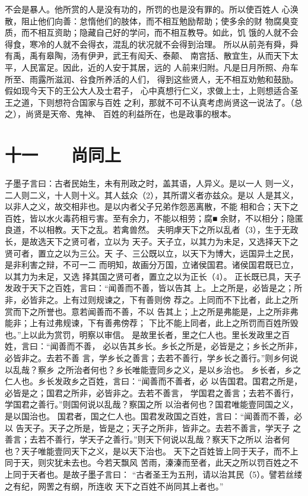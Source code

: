 \documentclass[12pt,UTF8]{ctexbook}
\begin{document}
不会是暴人。他所赏的人是没有功的，所罚的也是没有罪的。所以使百姓人 
心涣散，阻止他们向善：怠惰他们的肢体，而不相互勉励帮助；使多余的财 
物腐臭变质，而不相互资助；隐藏自己好的学问，而不相互教导。如此，饥 
饿的人就不会得食，寒冷的人就不会得衣，混乱的状况就不会得到治理。 
所以从前尧有舜，舜有禹，禹有皋陶，汤有伊尹，武王有闳夭、泰颠、 
南宫括、散宜生，从而天下太平，人民富足。因此，近的人安于其居，远的 
人前来归附。凡是日月所照、舟车所至、雨露所滋润、谷食所养活的人们， 
得到这些贤人，无不相互劝勉和鼓励。假如现今天下的王公大人及士君子， 
心中真想行仁义，求做上士，上则想适合圣王之道，下则想符合国家与百姓 
之利，那就不可不认真考虑尚贤这一说法了。（总之），尚贤是天帝、鬼神、 
百姓的利益所在，也是政事的根本。 

\chapter{十一　　尚同上}

子墨子言曰：古者民始生，未有刑政之时，盖其语，人异义。是以一人 
则一义，二人则二义，十人则十义。其人兹众（2），其所谓义者亦兹众。是以 
人是其义，以非人之义，故交相非也。是以内者父子兄弟作怨恶离散，不能 
相和合；天下之百姓，皆以水火毒药相亏害。至有余力，不能以相劳；腐■ 
余财，不以相分；隐匿良道，不以相教。天下之乱。若禽兽然。 
夫明虖天下之所以乱者（3），生于无政长，是故选天下之贤可者，立以为 
天子。天子立，以其力为未足，又选择天下之贤可者，置立之以为三公。天 
子、三公既以立，以天下为博大，远国异土之民，是非利害之辩，不可一二 
而明知，故画分万国，立诸侯国君。诸侯国君既已立，以其力为未足，又选 
择其国之贤可者，置立之以为正长（4）。 
正长既已具，天子发政于天下之百姓，言曰：“闻善而不善，皆以告其 
上。上之所是，必皆是之；所非，必皆非之。上有过则规谏之，下有善则傍 
荐之。上同而不下比者，此上之所赏而下之所誉也。意若闻善而不善，不以 
告其上；上之所是弗能是，上之所非弗能非；上有过弗规谏，下有善弗傍荐； 
下比不能上同者，此上之所罚而百姓所毁也。”上以此为赏罚，明察以审信。 
是故里长者，里之仁人也。里长发政里之百姓，言曰：“闻善而不善， 
必以告其乡长。乡长之所是，必皆是之；乡长之所非，必皆非之。去若不善 
言，学乡长之善言；去若不善行，学乡长之善行。”则乡何说以乱哉？察乡 
之所治者何也？乡长唯能壹同乡之义，是以乡治也。 
乡长者，乡之仁人也。乡长发政乡之百姓，言曰：“闻善而不善者，必 
以告国君。国君之所是，必皆是之；国君之所非，必皆非之。去若不善言， 
学国君之善言；去若不善行，学国君之善行。”则国何说以乱哉？察国之所 
以治者何也？国君唯能壹同国之义，是以国治也。 
国君者，国之仁人也。国君发政国之百姓，言曰：“闻善而不善，必以 
告天子。天子之所是，皆是之；天子之所非，皆非之。去若不善言，学天子 
之善言；去若不善行，学天子之善行。”则天下何说以乱哉？察天下之所以 
治者何也？天子唯能壹同天下之义，是以天下治也。 
天下之百姓皆上同于天子，而不上同于天，则灾犹未去也。今若天飘风 
苦雨，溱溱而至者，此天之所以罚百姓之不上同于天者也。是故子墨子言曰： 
“古者圣王为五刑，请以治其民（5）。譬若丝缕之有纪，网罟之有纲，所连收 
天下之百姓不尚同其上者也。” 
\end{document}
